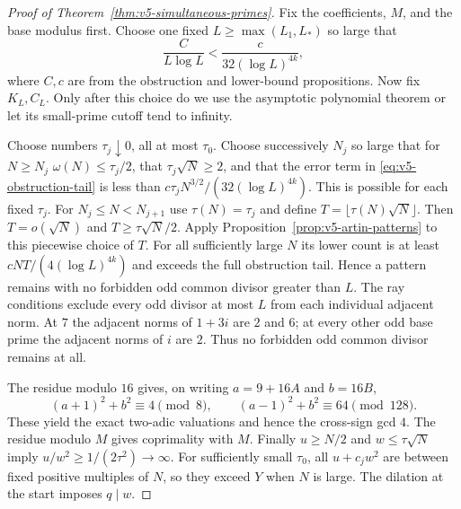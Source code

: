 \documentclass[11pt]{article}
\theoremstyle{definition}
\theoremstyle{remark}
\begin{document}
\begin{proof}[Proof of Theorem~\ref{thm:v5-simultaneous-primes}]
Fix the coefficients, $M$, and the base modulus first. Choose one fixed
$L\geq\max(L_1,L_*)$ so large that
\[
 \frac C{L\log L}<\frac c{32(\log L)^{4k}},
\]
where $C,c$ are from the obstruction and lower-bound propositions.
Now fix $K_L,C_L$. Only after this choice do we use the asymptotic
polynomial theorem or let its small-prime cutoff tend to infinity.

Choose numbers $\tau_j\downarrow0$, all at most $\tau_0$.
Choose successively $N_j$ so large that for $N\geq N_j$
$\omega(N)\leq\tau_j/2$,
that $\tau_j\sqrt N\geq2$, and that the error term in
\eqref{eq:v5-obstruction-tail} is less than
$c\tau_jN^{3/2}/(32(\log L)^{4k})$.
This is possible for each fixed $\tau_j$.
For $N_j\leq N<N_{j+1}$ use $\tau(N)=\tau_j$ and define
$T=\lfloor\tau(N)\sqrt N\rfloor$.
Then $T=o(\sqrt N)$ and $T\geq\tau\sqrt N/2$.
Apply Proposition~\ref{prop:v5-artin-patterns} to this piecewise choice
of $T$. For all sufficiently large $N$ its lower count is at least
$cNT/(4(\log L)^{4k})$ and exceeds the full obstruction tail.
Hence a pattern remains with no forbidden odd
common divisor greater than $L$.
The ray conditions exclude every odd divisor at most $L$ from each
individual adjacent norm. At $7$ the adjacent norms of $1+3i$ are $2$
and $6$; at every other odd base prime the adjacent norms of $i$ are $2$.
Thus no forbidden odd common divisor remains at all.

The residue modulo $16$ gives, on writing $a=9+16A$ and $b=16B$,
\[
 (a+1)^2+b^2\equiv4\pmod8,\qquad
 (a-1)^2+b^2\equiv64\pmod{128}.
\]
These yield the exact two-adic valuations and hence the cross-sign gcd
$4$. The residue modulo $M$ gives coprimality with $M$.
Finally $u\geq N/2$ and $w\leq\tau\sqrt N$ imply
$u/w^2\geq1/(2\tau^2)\to\infty$.
For sufficiently small $\tau_0$, all $u+c_jw^2$ are between fixed positive
multiples of $N$, so they exceed $Y$ when $N$ is large.
The dilation at the start imposes $q\mid w$.
\end{proof}
\end{document}
